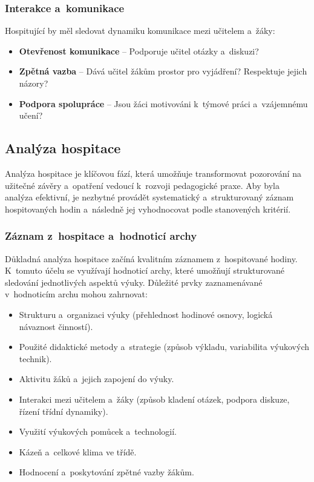 \subsubsection{Interakce a~komunikace}
Hospitující by měl sledovat dynamiku komunikace mezi učitelem a~žáky:
\begin{itemize}
    \item \textbf{Otevřenost komunikace} – Podporuje učitel otázky a~diskuzi?
    \item \textbf{Zpětná vazba} – Dává učitel žákům prostor pro vyjádření? Respektuje jejich názory?
    \item \textbf{Podpora spolupráce} – Jsou žáci motivováni k~týmové práci a~vzájemnému učení?
\end{itemize}


\subsection{Analýza hospitace}
Analýza hospitace je klíčovou fází, která umožňuje transformovat pozorování na užitečné závěry a~opatření vedoucí k~rozvoji pedagogické praxe. Aby byla analýza efektivní, je nezbytné provádět systematický a~strukturovaný záznam hospitovaných hodin a~následně jej vyhodnocovat podle stanovených kritérií.

\subsubsection{Záznam z~hospitace a~hodnoticí archy}
Důkladná analýza hospitace začíná kvalitním záznamem z~hospitované hodiny. K~tomuto účelu se využívají hodnoticí archy, které umožňují strukturované sledování jednotlivých aspektů výuky. Důležité prvky zaznamenávané v~hodnoticím archu mohou zahrnovat:
\begin{itemize}
    \item Strukturu a~organizaci výuky (přehlednost hodinové osnovy, logická návaznost činností).
    \item Použité didaktické metody a~strategie (způsob výkladu, variabilita výukových technik).
    \item Aktivitu žáků a~jejich zapojení do výuky.
    \item Interakci mezi učitelem a~žáky (způsob kladení otázek, podpora diskuze, řízení třídní dynamiky).
    \item Využití výukových pomůcek a~technologií.
    \item Kázeň a~celkové klima ve třídě.
    \item Hodnocení a~poskytování zpětné vazby žákům.
\end{itemize}

